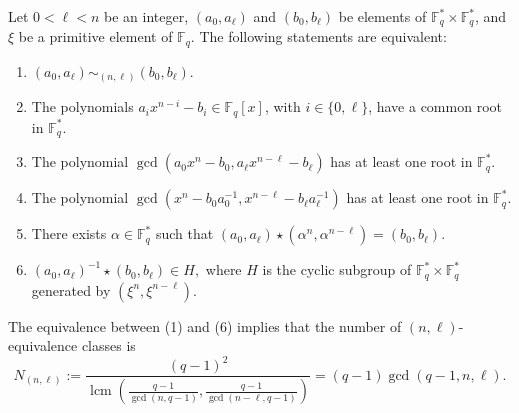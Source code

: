 \documentclass[12pt]{elsarticle}
\newcommand{\Fq}{\mathbb{F}_{q}}
\DeclareMathOperator{\lcm}{lcm}
\theoremstyle{break}
{\theorembodyfont{\upshape}
    \newtheorem{theorem}{Theorem}[section] %
    \newtheorem{lemma}[theorem]{Lemma} %
    \newtheorem{proposition}[theorem]{Proposition}
    \newtheorem{corollary}[theorem]{Corollary}
    \newtheorem{definition}[theorem]{Definition}
    \newtheorem{example}[theorem]{Example}
    \newtheorem{remark}[theorem]{Remark}
    \newtheorem{conjecture}[theorem]{Conjecture}
    \newtheorem*{proof}{{Proof}}
	\newtheorem*{notation}{Notation}
	\newtheorem*{main}{Cain Theorem}
	\newtheorem*{problem}{Problem}
}
\begin{document}
\begin{theorem}\label{Th.1}
Let $0<\ell<n$ be an integer,  $(a_0, a_{\ell})$ and $(b_0, b_{\ell})$ be elements of $\mathbb{F}_q^{*} \times \mathbb{F}_q^{*}$,  and  $\xi$ be  a primitive element of $\Fq$. 
The following statements are equivalent:

\begin{enumerate}
    \item $(a_0, a_{\ell}) \sim_{(n,\ell)} (b_0, b_{\ell}).$

    \item The polynomials $ a_i x^{n-i } - b_i \in \mathbb{F}_q[x]$, with $i \in \{0, \ell\}$, have a common root in $\mathbb{F}_q^*.$

    \item The polynomial $\gcd(a_0 x^n - b_0, a_{\ell} x^{n - \ell} - b_{\ell})$ has at least one root in $\mathbb{F}_q^*.$
       \item The polynomial $\gcd(x^n - b_0 a_0^{-1}, x^{n - \ell} - b_{\ell} a_{\ell}^{-1})$ has at least one root in $\mathbb{F}_q^*.$
     \item  There exists $\alpha\in \Fq^*$ such that $ (a_0,a_{\ell})\star ( \alpha^n,   \alpha^{n-\ell})= (b_0,b_{\ell}) $.
     
      \item  $ (a_0, a_{\ell})^{-1} \star(b_0,b_{\ell})\in H,$ where   $H$ is the cyclic subgroup of $\Fq^*\times \Fq^*$ generated by $(\xi^n,\xi^{n-\ell}) .$
\end{enumerate}
The equivalence between (1) and (6) implies that the number of $(n,\ell)$-equivalence classes is $$N_{(n,\ell)}:= \dfrac{ (q-1)^2}{ \lcm(\frac{q-1}{ \gcd(n,q-1)}, \frac{q-1}{ \gcd(n-\ell,q-1)})} = (q-1) \gcd(q-1,n,\ell).
$$
\end{theorem}
\end{document}
